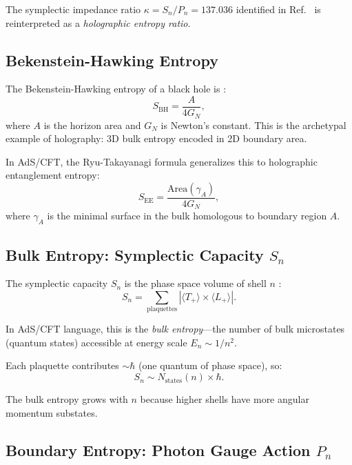 \documentclass[aps,prd,twocolumn,superscriptaddress,floatfix]{revtex4-2}
\begin{document}
The symplectic impedance ratio $\kappa = S_n/P_n = 137.036$ identified in Ref.~\cite{companion_alpha} is reinterpreted as a \textit{holographic entropy ratio}.

\subsection{Bekenstein-Hawking Entropy}

The Bekenstein-Hawking entropy of a black hole is \cite{bekenstein1973,hawking1975}:
\begin{equation}
S_{\text{BH}} = \frac{A}{4G_N},
\end{equation}
where $A$ is the horizon area and $G_N$ is Newton's constant. This is the archetypal example of holography: 3D bulk entropy encoded in 2D boundary area.

In AdS/CFT, the Ryu-Takayanagi formula \cite{ryu2006} generalizes this to holographic entanglement entropy:
\begin{equation}
S_{\text{EE}} = \frac{\text{Area}(\gamma_A)}{4G_N},
\label{eq:ryu_takayanagi}
\end{equation}
where $\gamma_A$ is the minimal surface in the bulk homologous to boundary region $A$.

\subsection{Bulk Entropy: Symplectic Capacity $S_n$}

The symplectic capacity $S_n$ is the phase space volume of shell $n$ \cite{companion_alpha}:
\begin{equation}
S_n = \sum_{\text{plaquettes}} |\langle T_+ \rangle \times \langle L_+ \rangle|.
\end{equation}

In AdS/CFT language, this is the \textit{bulk entropy}---the number of bulk microstates (quantum states) accessible at energy scale $E_n \sim 1/n^2$.

Each plaquette contributes $\sim \hbar$ (one quantum of phase space), so:
\begin{equation}
S_n \sim N_{\text{states}}(n) \times \hbar.
\end{equation}

The bulk entropy grows with $n$ because higher shells have more angular momentum substates.

\subsection{Boundary Entropy: Photon Gauge Action $P_n$}
\end{document}
